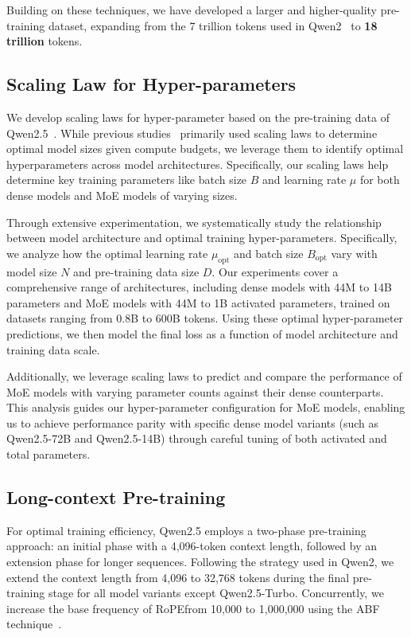 \documentclass{article}
\begin{document}
Building on these techniques, we have developed a larger and higher-quality pre-training dataset, expanding from the 7 trillion tokens used in Qwen2~\citep{qwen2} to \textbf{18 trillion} tokens.

\subsection{Scaling Law for Hyper-parameters}
We develop scaling laws for hyper-parameter based on the pre-training data of Qwen2.5~\citep{chinchilla,kaplanscaling}. While previous studies~\citep{llama3,falcon,chinchilla} primarily used scaling laws to determine optimal model sizes given compute budgets, we leverage them to identify optimal hyperparameters across model architectures. Specifically, our scaling laws help determine key training parameters like batch size $B$ and learning rate $\mu$ for both dense models and MoE models of varying sizes.

Through extensive experimentation, we systematically study the relationship between model architecture and optimal training hyper-parameters. Specifically, we analyze how the optimal learning rate $\mu_\textrm{opt}$ and batch size $B_\textrm{opt}$ vary with model size $N$ and pre-training data size $D$. Our experiments cover a comprehensive range of architectures, including dense models with 44M to 14B parameters and MoE models with 44M to 1B activated parameters, trained on datasets ranging from 0.8B to 600B tokens. Using these optimal hyper-parameter predictions, we then model the final loss as a function of model architecture and training data scale.

Additionally, we leverage scaling laws to predict and compare the performance of MoE models with varying parameter counts against their dense counterparts. This analysis guides our hyper-parameter configuration for MoE models, enabling us to achieve performance parity with specific dense model variants (such as Qwen2.5-72B and Qwen2.5-14B) through careful tuning of both activated and total parameters.

\subsection{Long-context Pre-training}

For optimal training efficiency, Qwen2.5 employs a two-phase pre-training approach: an initial phase with a 4,096-token context length, followed by an extension phase for longer sequences. Following the strategy used in Qwen2, we extend the context length from 4,096 to 32,768 tokens during the final pre-training stage for all model variants except Qwen2.5-Turbo. Concurrently, we increase the base frequency of RoPEfrom 10,000 to 1,000,000 using the ABF technique~\citep{ropeabf}.
\end{document}
